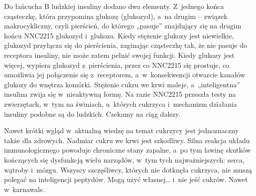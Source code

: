 \begin{dwieszpalty}
Do łańcucha B ludzkiej insuliny dodano dwa elementy. Z~jednego końca cząsteczkę, która przypomina glukozę (glukozyd), a~na drugim – związek makrocykliczny, czyli pierścień, do którego „pasuje” znajdujący się na drugim końcu NNC2215 glukozyd i~glukoza. Kiedy stężenie glukozy jest niewielkie, glukozyd przyłącza się do pierścienia, zaginając cząsteczkę tak, że nie pasuje do receptora insuliny, nie może zatem pełnić swojej funkcji. Kiedy glukozy jest więcej, wypiera glukozyd z~pierścienia, przez co NNC2215 się prostuje, co umożliwia jej połączenie się z~receptorem, a~w~konsekwencji otwarcie kanałów glukozy do wnętrza komórki. Stężenie cukru we krwi maleje, a~„inteligentna” insulina zwija się w~nieaktywną formę. Na razie NNC2215 przeszła testy na zwierzętach, w~tym na świniach, u~których cukrzyca i~mechanizm działania insuliny podobne są do ludzkich.  Czekamy na ciąg dalszy.

Nawet krótki wgląd w~aktualną wiedzę na temat cukrzycy jest jednoznaczny także dla zdrowych. Nadmiar cukru we krwi jest szkodliwy. Silna reakcja układu immunologicznego powoduje chroniczne stany zapalne, a~po tym lawinę skutków kończących się dysfunkcją wielu narządów, w~tym tych najważniejszych: serca, wątroby i~mózgu.  Wszyscy szczęśliwcy, których nie dotknęła cukrzyca, nie muszą polegać na inteligencji peptydów. Mogą użyć własnej… i~nie jeść cukrów. Nawet w~karnawale. 



\medskip
{}

\end{dwieszpalty}

\normalsize